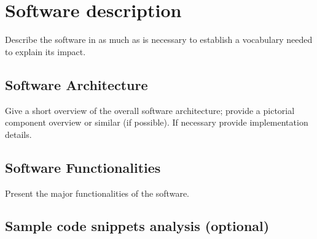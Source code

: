 \section{Software description}
\label{} 

Describe the software in as much as is necessary to establish a vocabulary needed to explain its impact. 


\subsection{Software Architecture}
\label{} 

Give a short overview of the overall software architecture; provide a pictorial component overview or similar (if possible). If necessary provide implementation details.


\subsection{Software Functionalities}
\label{} 

Present the major functionalities of the software.


\subsection{Sample code snippets analysis (optional)}
\label{} 